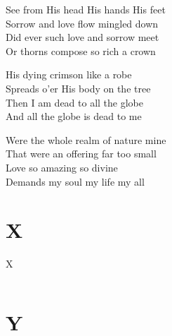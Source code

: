 \documentclass{beamer}
\begin{document}
{\begin{frame}{}
See from His head His hands His feet\\ 
Sorrow and love flow mingled down\\ 
Did ever such love and sorrow meet\\ 
Or thorns compose so rich a crown 

\end{frame}

\hypertarget{When I survey the wondrous cross[](Watts)(4)}{}
\begin{frame}{}
\fontsize{ 18 }{ 23 }\selectfont

His dying crimson like a robe\\ 
Spreads o'er His body on the tree\\ 
Then I am dead to all the globe\\ 
And all the globe is dead to me 

\end{frame}

\hypertarget{When I survey the wondrous cross[](Watts)5}{}
\begin{frame}{}
\fontsize{ 18 }{ 23 }\selectfont

Were the whole realm of nature mine\\ 
That were an offering far too small\\ 
Love so amazing so divine\\ 
Demands my soul my life my all 

\end{frame}

}
\section{X}

\begin{frame}{X}
\begin{columns}

    


    


\end{columns}

\end{frame}

\section{Y}
\end{document}
